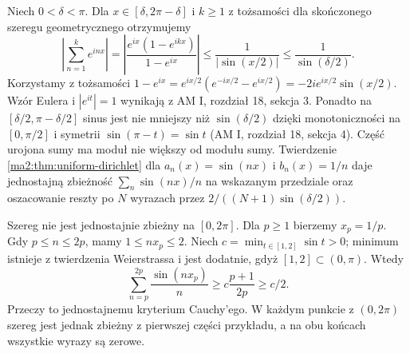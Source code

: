 \begin{przyklad}
\label{ma2:ex:dirichlet-sine}
Niech $0<\delta<\pi$. Dla $x\in[\delta,2\pi-\delta]$
i $k\ge1$ z tożsamości dla skończonego szeregu
geometrycznego otrzymujemy
\[
 \left|\sum_{n=1}^k e^{inx}\right|
 =\left|\frac{e^{ix}(1-e^{ikx})}{1-e^{ix}}\right|
 \le\frac1{|\sin(x/2)|}
 \le\frac1{\sin(\delta/2)}.
\]
Korzystamy z tożsamości
$1-e^{ix}=e^{ix/2}(e^{-ix/2}-e^{ix/2})
=-2i e^{ix/2}\sin(x/2)$.
Wzór Eulera i $|e^{it}|=1$ wynikają z AM I,
rozdział 18, sekcja 3. Ponadto na
$[\delta/2,\pi-\delta/2]$ sinus jest nie mniejszy
niż $\sin(\delta/2)$ dzięki monotoniczności
na $[0,\pi/2]$ i symetrii $\sin(\pi-t)=\sin t$
(AM I, rozdział 18, sekcja 4).
Część urojona sumy
ma moduł nie większy od modułu sumy.
Twierdzenie \ref{ma2:thm:uniform-dirichlet}
dla $a_n(x)=\sin(nx)$ i $b_n(x)=1/n$
daje jednostajną zbieżność $\sum_n\sin(nx)/n$
na wskazanym przedziale oraz oszacowanie reszty
po $N$ wyrazach przez $2/((N+1)\sin(\delta/2))$.

Szereg nie jest jednostajnie zbieżny na $[0,2\pi]$.
Dla $p\ge1$ bierzemy $x_p=1/p$. Gdy $p\le n\le2p$,
mamy $1\le nx_p\le2$. Niech
$c=\min_{t\in[1,2]}\sin t>0$; minimum istnieje
z twierdzenia Weierstrassa i jest dodatnie,
gdyż $[1,2]\subset(0,\pi)$. Wtedy
\[
 \sum_{n=p}^{2p}\frac{\sin(nx_p)}n
 \ge c\frac{p+1}{2p}\ge c/2.
\]
Przeczy to jednostajnemu kryterium Cauchy'ego.
W każdym punkcie z $(0,2\pi)$ szereg jest jednak
zbieżny z pierwszej części przykładu, a na obu
końcach wszystkie wyrazy są zerowe.
\end{przyklad}

